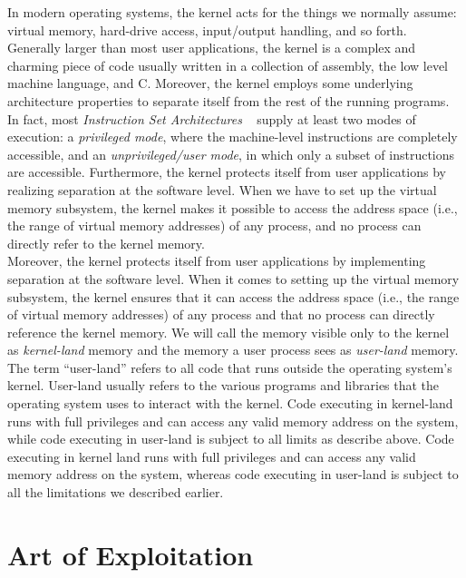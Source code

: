 \documentclass{masterthesis}
\begin{document}
In modern operating systems, the kernel acts for the things we normally assume: virtual memory, hard-drive access, input/output handling, and so forth. Generally larger than most user applications, the kernel is a complex and charming piece of code usually written in a collection of assembly, the low level machine language, and C.
Moreover, the kernel employs some underlying architecture properties to separate itself from the rest of the running programs.
In fact, most \emph{Instruction Set Architectures} ~\cite{silberman1993architectural} supply at least two modes of execution: a \emph{privileged mode}, where the machine-level instructions are completely accessible, and an \emph{unprivileged/user mode}, in which only a subset of instructions are accessible.
Furthermore, the kernel protects itself from user applications by realizing separation at the software level.
When we have to set up the virtual memory subsystem, the kernel makes it possible to access the address space (i.e., the range of virtual memory addresses) of any process, and no process can directly refer to the kernel memory.\\

Moreover, the kernel protects itself from user applications by implementing separation at the software level. When it comes to setting up the virtual memory subsystem, the kernel ensures that it can access the address space (i.e., the range of virtual memory addresses) of any process and that no process can directly reference the kernel memory. 
We will call the memory visible only to the kernel as \emph{kernel-land} memory and the memory a user process sees as \emph{user-land} memory. The term ``user-land'' refers to all code that runs outside the operating system's kernel. User-land usually refers to the various programs and libraries that the operating system uses to interact with the kernel.
Code executing in kernel-land runs with full privileges and can access any valid memory address on the system, while code executing in user-land is subject to all limits as describe above.
Code executing in kernel land runs with full privileges and can access any valid memory address on the system, whereas code executing in user-land is subject to all the limitations we described earlier.


\chapter{Art of Exploitation}
\label{ch:exploitation}
\end{document}
